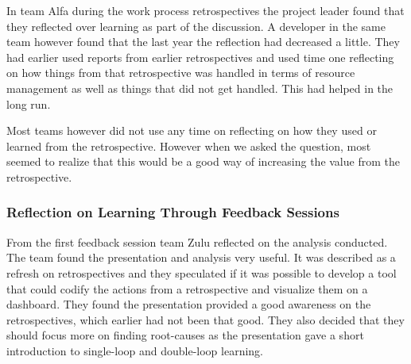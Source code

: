 In team Alfa during the work process retrospectives the project leader found that they reflected over learning as part of the discussion. A developer in the same team however found that the last year the reflection had decreased a little. They had earlier used reports from earlier retrospectives and used time one reflecting on how things from that retrospective was handled in terms of resource management as well as things that did not get handled. This had helped in the long run. 

Most teams however did not use any time on reflecting on how they used or learned from the retrospective. However when we asked the question, most seemed to realize that this would be a good way of increasing the value from the retrospective. 

\begin{table}[!h]
	\begin{center}
	\caption{Learning Reflection}
	\label{table:learning-reflection}
	\end{center}
\end{table}

\subsubsection{Reflection on Learning Through Feedback Sessions}
\label{result:learning-reflection-zulu}
From the first feedback session team Zulu reflected on the analysis conducted. The team found the presentation and analysis very useful. It was described as a refresh on retrospectives and they speculated if it was possible to develop a tool that could codify the actions from a retrospective and visualize them on a dashboard. They found the presentation provided a good awareness on the retrospectives, which earlier had not been that good. They also decided that they should focus more on finding root-causes as the presentation gave a short introduction to single-loop and double-loop learning.

